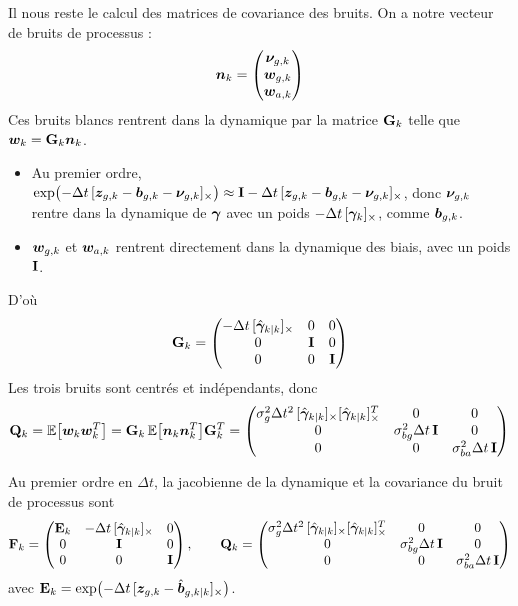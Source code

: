 Il nous reste le calcul des matrices de covariance des bruits. On a notre vecteur de bruits de processus :
\[
    \bm{n}_k = \begin{pmatrix} \bm{\nu}_{g,k}\\ \bm{w}_{g,k}\\ \bm{w}_{a,k} \end{pmatrix}
\]
Ces bruits blancs rentrent dans la dynamique par la matrice $\mathbf{G}_k$ telle que $\bm{w}_k = \mathbf{G}_k\bm{n}_k$.
\begin{itemize}
    \item Au premier ordre, $\exp\bigl(-\Delta t\,[\bm{z}_{g,k} - \bm{b}_{g,k} - \bm{\nu}_{g,k}]_{\times}\bigr) \approx \mathbf{I} - \Delta t\,[\bm{z}_{g,k} - \bm{b}_{g,k} - \bm{\nu}_{g,k}]_{\times}$, donc $\bm{\nu}_{g,k}$ rentre dans la dynamique de $\bm{\gamma}$ avec un poids $-\Delta t\,[\bm{\gamma}_k]_{\times}$, comme $\bm{b}_{g,k}$.
    \item $\bm{w}_{g,k}$ et $\bm{w}_{a,k}$ rentrent directement dans la dynamique des biais, avec un poids $\mathbf{I}$.
\end{itemize}
D'où
\[
    \mathbf{G}_k = \begin{pmatrix}
        -\Delta t\,[\hat{\bm{\gamma}}_{k|k}]_{\times} & 0 & 0\\
        0 & \mathbf{I} & 0\\
        0 & 0 & \mathbf{I}
    \end{pmatrix}
\]
Les trois bruits sont centrés et indépendants, donc
\[
    \mathbf{Q}_k = \mathbb{E}\bigl[\bm{w}_k\bm{w}_k^T\bigr]
    = \mathbf{G}_k\,\mathbb{E}\bigl[\bm{n}_k\bm{n}_k^T\bigr]\mathbf{G}_k^T
    = \begin{pmatrix}
        \sigma_g^2\Delta t^2\,[\hat{\bm{\gamma}}_{k|k}]_{\times}[\hat{\bm{\gamma}}_{k|k}]_{\times}^T & 0 & 0\\
        0 & \sigma_{bg}^2\Delta t\,\mathbf{I} & 0\\
        0 & 0 & \sigma_{ba}^2\Delta t\,\mathbf{I}
    \end{pmatrix}
\]

\begin{proposition}
    Au premier ordre en $\Delta t$, la jacobienne de la dynamique et la covariance du bruit de processus sont
    \[
        \mathbf{F}_k = \begin{pmatrix}
            \mathbf{E}_k & -\Delta t\,[\hat{\bm{\gamma}}_{k|k}]_{\times} & 0\\
            0 & \mathbf{I} & 0\\
            0 & 0 & \mathbf{I}
        \end{pmatrix},
        \qquad
        \mathbf{Q}_k = \begin{pmatrix}
            \sigma_g^2\Delta t^2\,[\hat{\bm{\gamma}}_{k|k}]_{\times}[\hat{\bm{\gamma}}_{k|k}]_{\times}^T & 0 & 0\\
            0 & \sigma_{bg}^2\Delta t\,\mathbf{I} & 0\\
            0 & 0 & \sigma_{ba}^2\Delta t\,\mathbf{I}
        \end{pmatrix}
    \]
    avec $\mathbf{E}_k = \exp\bigl(-\Delta t\,[\bm{z}_{g,k} - \hat{\bm{b}}_{g,k|k}]_{\times}\bigr)$.
\end{proposition}

